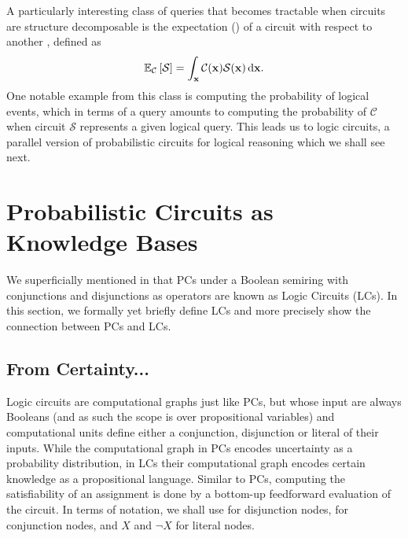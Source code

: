 A particularly interesting class of queries that becomes tractable when circuits are structure
decomposable is the expectation (\expc{}) of a circuit with respect to another \citep{choi20},
defined as
\begin{equation}
  \mathbb{E}_\mathcal{C}\left[\mathcal{S}\right]=\int_{\mathbf{x}}\mathcal{C}(\mathbf{x})\mathcal{S}(\mathbf{x})\mathop{}\!\mathrm{d}\mathbf{x}.
  \label{eq:exp}
\end{equation}
One notable example from this class is computing the probability of logical events, which in terms
of a \expc{} query amounts to computing the probability of $\mathcal{C}$ when circuit $\mathcal{S}$
represents a given logical query. This leads us to logic circuits, a parallel version of
probabilistic circuits for logical reasoning which we shall see next.

\section{Probabilistic Circuits as Knowledge Bases}
\label{sec:pckb}

We superficially mentioned in  that PCs under a Boolean semiring with
conjunctions and disjunctions as operators are known as Logic Circuits (LCs). In this section, we
formally yet briefly define LCs and more precisely show the connection between PCs and LCs.

\subsection{From Certainty...}
\label{subsection:fromcertainty}

Logic circuits are computational graphs just like PCs, but whose input are always Booleans (and as
such the scope is over propositional variables) and computational units define either a
conjunction, disjunction or literal of their inputs. While the computational graph in PCs encodes
uncertainty as a probability distribution, in LCs their computational graph encodes certain
knowledge as a propositional language. Similar to PCs, computing the satisfiability of an
assignment is done by a bottom-up feedforward evaluation of the circuit. In terms of notation, we
shall use \inode{\newOrNode} for disjunction nodes, \inode{\newAndNode} for conjunction nodes, and
$X$ and $\neg X$ for literal nodes.

